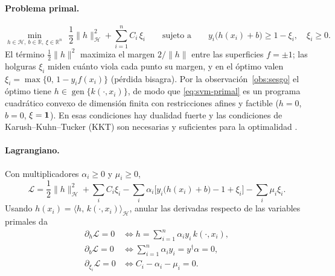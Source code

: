 \documentclass[11pt,a4paper]{article}
\newcommand{\R}{\mathbb{R}}
\newcommand{\Hk}{\mathcal{H}}
\newcommand{\dg}{\dagger}                         %
\newcommand{\inner}[2]{\langle #1,\, #2\rangle}
\newcommand{\norm}[1]{\lVert #1\rVert}
\DeclareMathOperator{\gen}{gen}
\theoremstyle{plain}
\theoremstyle{definition}
\theoremstyle{remark}
\numberwithin{equation}{section}
\begin{document}
\paragraph{Problema primal.} \cite{cortesvapnik1995}
\begin{equation}\label{eq:svm-primal}
  \min_{h\in\Hk,\ b\in\R,\ \xi\in\R^n}\ \ \frac12\norm{h}_{\Hk}^2+\sum_{i=1}^nC_i\,\xi_i
  \qquad\text{sujeto a}\qquad y_i\bigl(h(x_i)+b\bigr)\ge1-\xi_i,\quad\xi_i\ge0 .
\end{equation}
El término $\frac12\norm h^2$ maximiza el margen $2/\norm h$ entre las superficies
$f=\pm1$; las holguras $\xi_i$ miden cuánto viola cada punto su margen, y en el óptimo valen
$\xi_i=\max\{0,\,1-y_if(x_i)\}$ (pérdida bisagra). Por la observación~\ref{obs:sesgo} el
óptimo tiene $h\in\gen\{k(\cdot,x_i)\}$, de modo que \eqref{eq:svm-primal} es un programa
cuadrático convexo de dimensión finita con restricciones afines y factible
($h=0$, $b=0$, $\xi=\mathbf{1}$). En esas condiciones hay dualidad fuerte y las condiciones de
Karush--Kuhn--Tucker (KKT) son necesarias y suficientes para la optimalidad
\cite[secciones 5.2.3 y 5.5.3]{boyd2004}.

\paragraph{Lagrangiano.} Con multiplicadores $\alpha_i\ge0$ y $\mu_i\ge0$,
\begin{equation}\label{eq:svm-lagrangian}
  \mathcal L=\frac12\norm{h}_{\Hk}^2+\sum_iC_i\xi_i
  -\sum_i\alpha_i\bigl[y_i\bigl(h(x_i)+b\bigr)-1+\xi_i\bigr]-\sum_i\mu_i\xi_i .
\end{equation}
Usando $h(x_i)=\inner{h}{k(\cdot,x_i)}_{\Hk}$, anular las derivadas respecto de las variables
primales da
\begin{align}
  \partial_h\mathcal L=0 &\iff h=\sum_{i=1}^n\alpha_iy_i\,k(\cdot,x_i), \label{eq:stationarity-h}\\
  \partial_b\mathcal L=0 &\iff \sum_{i=1}^n\alpha_iy_i=y^{\dg}\alpha=0, \label{eq:stationarity-b}\\
  \partial_{\xi_i}\mathcal L=0 &\iff C_i-\alpha_i-\mu_i=0 . \label{eq:stationarity-xi}
\end{align}
\end{document}
